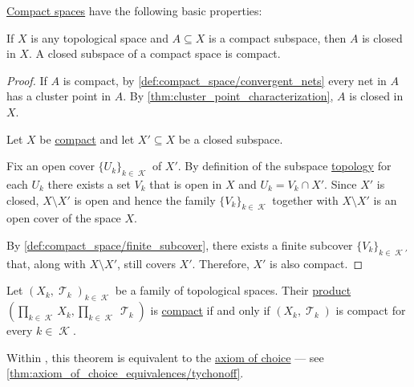 \begin{proposition}\label{thm:def:compact_space}
  \hyperref[def:compact_space]{Compact spaces} have the following basic properties:
  \begin{thmenum}
     If \( X \) is any topological space and \( A \subseteq X \) is a compact subspace, then \( A \) is closed in \( X \).
     A closed subspace of a compact space is compact.
  \end{thmenum}
\end{proposition}
\begin{proof}
   If \( A \) is compact, by \cref{def:compact_space/convergent_nets} every net in \( A \) has a cluster point in \( A \). By \cref{thm:cluster_point_characterization}, \( A \) is closed in \( X \).

   Let \( X \) be \hyperref[def:compact_space]{compact} and let \( X' \subseteq X \) be a closed subspace.

  Fix an open cover \( \{ U_k \}_{k \in \mscrK} \) of \( X' \). By definition of the subspace \hyperref[def:topological_subspace]{topology} for each \( U_k \) there exists a set \( V_k \) that is open in \( X \) and \( U_k = V_k \cap X' \). Since \( X' \) is closed, \( X \setminus X' \) is open and hence the family \( \{ V_k \}_{k \in \mscrK} \) together with \( X \setminus X' \) is an open cover of the space \( X \).

  By \cref{def:compact_space/finite_subcover}, there exists a finite subcover \( \{ V_k \}_{k \in \mscrK'} \) that, along with \( X \setminus X' \), still covers \( X' \). Therefore, \( X' \) is also compact.
\end{proof}

\begin{theorem}\label{thm:tychonoffs_product_theorem}
  Let \( { (X_k, \mscrT_k) }_{k \in \mscrK} \) be a family of topological spaces. Their \hyperref[def:topological_product]{product} \( (\prod_{k \in \mscrK} X_k, \prod_{k \in \mscrK} \mscrT_k) \) is \hyperref[def:compact_space]{compact} if and only if \( (X_k, \mscrT_k) \) is compact for every \( k \in \mscrK \).
\end{theorem}
\begin{comments}
  \item Within \hyperref[def:zfc]{}, this theorem is equivalent to the \hyperref[def:zfc/choice]{axiom of choice} --- see \cref{thm:axiom_of_choice_equivalences/tychonoff}.
\end{comments}

